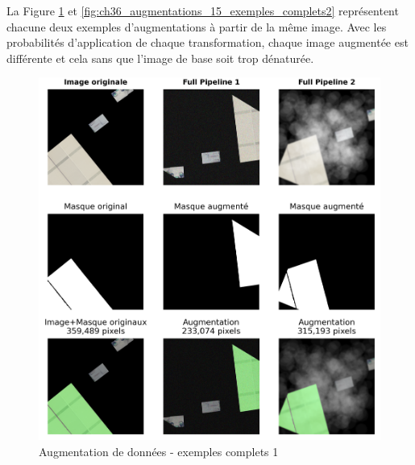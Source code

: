 La Figure \ref{fig:ch36_augmentations_14_exemples_complets1} et \ref{fig:ch36_augmentations_15_exemples_complets2} représentent chacune deux exemples d'augmentations à partir de la même image. Avec les probabilités d'application de chaque transformation, chaque image augmentée est différente et cela sans que l'image de base soit trop dénaturée.
\begin{figure}[H]
    \centering
    \includegraphics[width=1\linewidth]{02-main/figures/ch3/ch36_augmentations_14_exemples_complets1.png}
    \caption{Augmentation de données - exemples complets 1}
    \label{fig:ch36_augmentations_14_exemples_complets1}
\end{figure}


